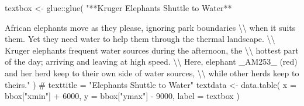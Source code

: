 \documentclass[]{article}
\newenvironment{Shaded}{}{}
\newcommand{\CharTok}[1]{\textcolor[rgb]{0.00,0.50,0.50}{#1}}
\newcommand{\CommentTok}[1]{\textcolor[rgb]{0.00,0.50,0.00}{#1}}
\newcommand{\DataTypeTok}[1]{#1}
\newcommand{\DecValTok}[1]{#1}
\newcommand{\KeywordTok}[1]{\textcolor[rgb]{0.00,0.00,1.00}{#1}}
\newcommand{\NormalTok}[1]{#1}
\newcommand{\OperatorTok}[1]{#1}
\newcommand{\StringTok}[1]{\textcolor[rgb]{0.00,0.50,0.50}{#1}}
\begin{document}
\begin{Shaded}
\begin{Highlighting}[]
\NormalTok{textbox <-}\StringTok{ }\NormalTok{glue}\OperatorTok{::}\KeywordTok{glue}\NormalTok{(}
  \StringTok{"**Kruger Elephants Shuttle to Water**}

\StringTok{  African elephants move as they please, ignoring park boundaries }\CharTok{\textbackslash{}\textbackslash{}}
\StringTok{  when it suits them. Yet they need water to help them through the thermal landscape. }\CharTok{\textbackslash{}\textbackslash{}}
\StringTok{  Kruger elephants frequent water sources during the afternoon, the }\CharTok{\textbackslash{}\textbackslash{}}
\StringTok{  hottest part of the day; arriving and leaving at high speed. }\CharTok{\textbackslash{}\textbackslash{}}
\StringTok{  Here, elephant _AM253_ (red) and her herd keep to their own side of water sources, }\CharTok{\textbackslash{}\textbackslash{}}
\StringTok{  while other herds keep to theirs."}
\NormalTok{)}
\CommentTok{# texttitle = "Elephants Shuttle to Water"}
\NormalTok{textdata <-}\StringTok{ }\KeywordTok{data.table}\NormalTok{(}
  \DataTypeTok{x =}\NormalTok{ bbox[}\StringTok{"xmin"}\NormalTok{] }\OperatorTok{+}\StringTok{ }\DecValTok{6000}\NormalTok{,}
  \DataTypeTok{y =}\NormalTok{ bbox[}\StringTok{"ymax"}\NormalTok{] }\OperatorTok{-}\StringTok{ }\DecValTok{9000}\NormalTok{,}
  \DataTypeTok{label =}\NormalTok{ textbox}
\NormalTok{)}
\end{Highlighting}
\end{Shaded}
\end{document}

